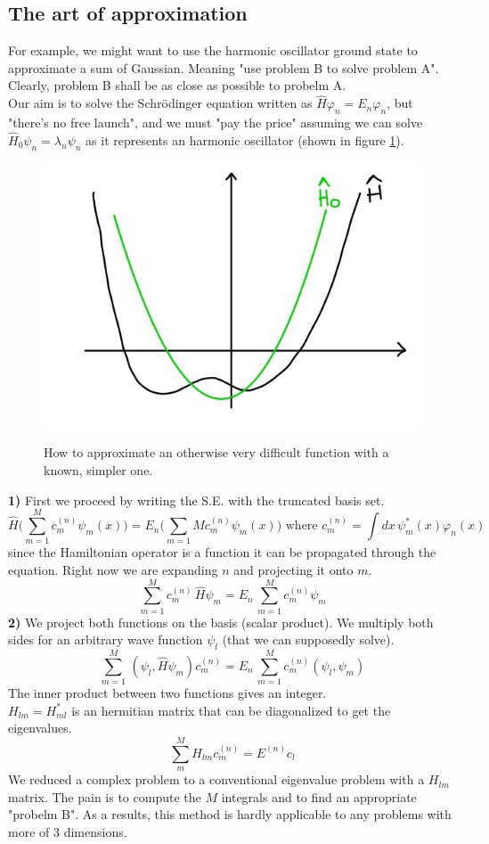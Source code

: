 \noindent
\subsection{The art of approximation}
For example, we might want to use the harmonic oscillator ground state to approximate a sum of Gaussian. Meaning "use problem B to solve problem A". Clearly, problem B shall be as close as possible to probelm A.\\
Our aim is to solve the Schr{\"o}dinger equation written as $\hat{H}\varphi_n=E_n\varphi_n$, but "there's no free launch", and we must "pay the price" assuming we can solve $\hat{H}_0\psi_n=\lambda_n\psi_n$ as it represents an harmonic oscillator (shown in figure \ref{fig:approximation}).\\
\begin{figure}[htbp!]
\includegraphics[scale=0.20]{img_1.jpg}
\label{fig:approximation}
\caption{How to approximate an otherwise very difficult function with a known, simpler one.}
\end{figure}
\textbf{1)} First we proceed by writing the S.E. with the truncated basis set.
\[
\hat{H}\bigg(\sum_{m=1}^{M}c_m^{(n)}\psi_m(x)\bigg)=E_n\bigg(\sum_{m=1}{M}c_m^{(n)}\psi_m(x)\bigg)
\text{ where $c_m^{(n)}=\int dx\,\psi_m^*(x)\varphi_n(x)$}
\]
since the Hamiltonian operator is a function it can be propagated through the equation. Right now we are expanding $n$ and projecting it onto $m$.\\
\[
\sum_{m=1}^{M}c_m^{(n)}\,\hat{H}\psi_m=E_n\,\sum_{m=1}^{M}c_m^{(n)}\psi_m\]
\textbf{2)} We project both functions on the basis (scalar product). We multiply both sides for an arbitrary wave function $\psi_l$ (that we can supposedly solve).
\[\sum_{m=1}^{M}\,(\psi_l,\hat{H}\psi_m)c_m^{(n)}=E_n\,\sum_{m=1}^{M}c_m^{(n)}(\psi_l,\psi_m)
\]
The inner product between two functions gives an integer. \\
$H_{lm}=H_{ml}^*$ is an hermitian matrix that can be diagonalized to get the eigenvalues.\\
\[
\sum_{m}^{M}H_{lm}c_m^{(n)}=E^{(n)}c_l
\]
We reduced a complex problem to a conventional eigenvalue problem with a $H_{lm}$ matrix. The pain is to compute the $M$ integrals and to find an appropriate "probelm B". As a results, this method is hardly applicable to any problems with more of 3 dimensions. \\

